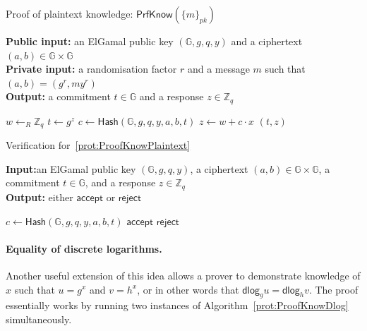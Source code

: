 \documentclass[12pt,a4paper]{article}
\newcommand{\dlog}{\mathsf{dlog}}
\theoremstyle{definition}
\begin{document}
\begin{algorithm}\caption{Proof of plaintext knowledge: $\mathsf{PrfKnow}(\{m\}_{pk})$}\label{prot:ProofKnowPlaintext}
    \textbf{Public input:} an ElGamal public key $(\mathbb{G}, g, q, y)$ and a ciphertext $(a, b)\in\mathbb{G}\times\mathbb{G}$\\
    \textbf{Private input:} a randomisation factor $r$ and a message $m$ such that $(a, b) = (g^r, my^r)$\\
    \textbf{Output:} a commitment $t\in\mathbb{G}$ and a response $z\in\mathbb{Z}_q$
    \begin{algorithmic}[1]
        \State $w\leftarrow_R\mathbb{Z}_q$
        \State $t \gets g^z$
        \State $c \gets \mathsf{Hash}(\mathbb{G}, g, q, y, a, b, t)$
        \State $z \gets w+c\cdot x$
        \State \Return $(t, z)$
    \end{algorithmic}
\end{algorithm}
\begin{algorithm}\caption{Verification for~\ref{prot:ProofKnowPlaintext}}\label{prot:VerifyKnowPlaintext}
    \textbf{Input:}an ElGamal public key $(\mathbb{G}, g, q, y)$, a ciphertext $(a, b)\in\mathbb{G}\times\mathbb{G}$, a commitment $t\in\mathbb{G}$, and a response $z\in\mathbb{Z}_q$\\
    \textbf{Output:} either $\mathsf{accept}$ or $\mathsf{reject}$
    \begin{algorithmic}[1]
        \State $c \gets \mathsf{Hash}(\mathbb{G}, g, q, y, a, b, t)$
            \State \Return $\mathsf{accept}$
        \Else
            \State \Return $\mathsf{reject}$
        \EndIf
    \end{algorithmic}
\end{algorithm}
\paragraph{Equality of discrete logarithms.}
Another useful extension of this idea allows a prover to demonstrate knowledge of $x$ such that $u=g^x$ and $v=h^x$, or in other words that $\dlog_g u=\dlog_h v$. The proof essentially works by running two instances of Algorithm~\ref{prot:ProofKnowDlog} simultaneously.
\end{document}
